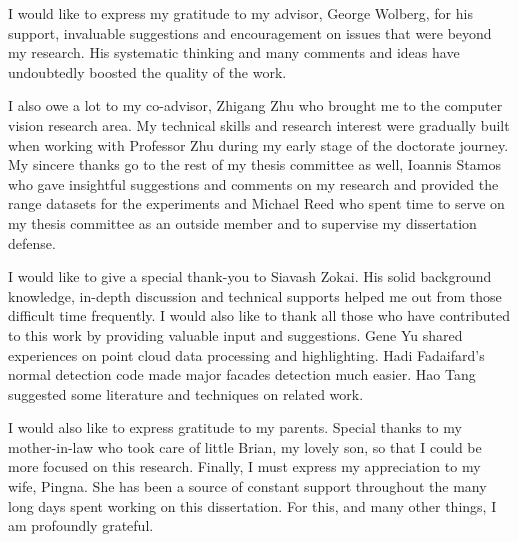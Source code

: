 I would like to express my gratitude to my advisor, George Wolberg,
for his support, invaluable suggestions and encouragement 
on issues that were beyond my research.
His systematic thinking and many comments and ideas 
have undoubtedly boosted the quality of the work.

I also owe a lot to my co-advisor, Zhigang Zhu who brought me to the computer
vision research area. 
My technical skills and research interest were gradually built when 
working with Professor Zhu during my early stage of the doctorate journey.
My sincere thanks go to the rest of my thesis committee as well, 
Ioannis Stamos who gave insightful suggestions and comments 
on my research and provided the range datasets for the experiments and
Michael Reed who spent time to serve on my thesis committee
as an outside member and to supervise my dissertation defense.

I would like to give a special thank-you to Siavash Zokai.
His solid background knowledge, in-depth discussion and technical supports 
helped me out from those difficult time frequently.
I would also like to thank all those who have contributed to this work 
by providing valuable input and suggestions.
Gene Yu shared experiences on point cloud data processing and highlighting.
Hadi Fadaifard's normal detection code made major facades detection much easier.
Hao Tang suggested some literature and techniques on related work.

I would also like to express gratitude to my parents.
Special thanks to my mother-in-law who took care of little Brian, 
my lovely son, so that I could be more focused on this research.
Finally, I must express my appreciation to my wife, Pingna.
She has been a source of constant support throughout 
the many long days spent working on this dissertation. 
For this, and many other things, I am profoundly grateful.


